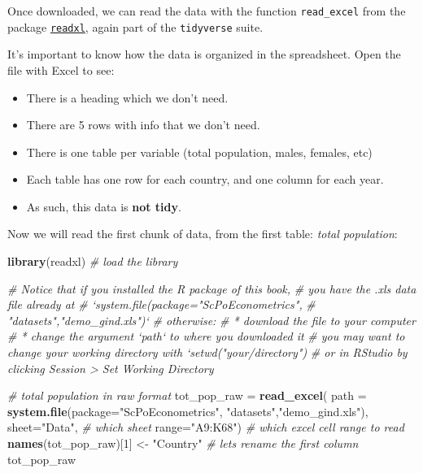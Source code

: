 \documentclass[]{book}
\newenvironment{Shaded}{\begin{snugshade}}{\end{snugshade}}
\newcommand{\KeywordTok}[1]{\textcolor[rgb]{0.13,0.29,0.53}{\textbf{#1}}}
\newcommand{\DataTypeTok}[1]{\textcolor[rgb]{0.13,0.29,0.53}{#1}}
\newcommand{\DecValTok}[1]{\textcolor[rgb]{0.00,0.00,0.81}{#1}}
\newcommand{\StringTok}[1]{\textcolor[rgb]{0.31,0.60,0.02}{#1}}
\newcommand{\CommentTok}[1]{\textcolor[rgb]{0.56,0.35,0.01}{\textit{#1}}}
\newcommand{\NormalTok}[1]{#1}
\providecommand{\tightlist}{%
  \setlength{\itemsep}{0pt}\setlength{\parskip}{0pt}}
\theoremstyle{definition}
\theoremstyle{definition}
\theoremstyle{definition}
\theoremstyle{remark}
\begin{document}
Once downloaded, we can read the data with the function
\texttt{read\_excel} from the package
\href{http://readxl.tidyverse.org}{\texttt{readxl}}, again part of the
\texttt{tidyverse} suite.

It's important to know how the data is organized in the spreadsheet.
Open the file with Excel to see:

\begin{itemize}
\tightlist
\item
  There is a heading which we don't need.
\item
  There are 5 rows with info that we don't need.
\item
  There is one table per variable (total population, males, females,
  etc)
\item
  Each table has one row for each country, and one column for each year.
\item
  As such, this data is \textbf{not tidy}.
\end{itemize}

Now we will read the first chunk of data, from the first table:
\emph{total population}:

\begin{Shaded}
\begin{Highlighting}[]
\KeywordTok{library}\NormalTok{(readxl)  }\CommentTok{# load the library}


\CommentTok{# Notice that if you installed the R package of this book,}
\CommentTok{# you have the .xls data file already at }
\CommentTok{# `system.file(package="ScPoEconometrics",}
\CommentTok{#                        "datasets","demo_gind.xls")`}
\CommentTok{# otherwise:}
\CommentTok{# * download the file to your computer}
\CommentTok{# * change the argument `path` to where you downloaded it}
\CommentTok{# you may want to change your working directory with `setwd("your/directory")}
\CommentTok{# or in RStudio by clicking Session > Set Working Directory}

\CommentTok{# total population in raw format}
\NormalTok{tot_pop_raw =}\StringTok{ }\KeywordTok{read_excel}\NormalTok{(}
                \DataTypeTok{path =} \KeywordTok{system.file}\NormalTok{(}\DataTypeTok{package=}\StringTok{"ScPoEconometrics"}\NormalTok{,}
                                    \StringTok{"datasets"}\NormalTok{,}\StringTok{"demo_gind.xls"}\NormalTok{), }
                \DataTypeTok{sheet=}\StringTok{"Data"}\NormalTok{, }\CommentTok{# which sheet}
                \DataTypeTok{range=}\StringTok{"A9:K68"}\NormalTok{)  }\CommentTok{# which excel cell range to read}
\KeywordTok{names}\NormalTok{(tot_pop_raw)[}\DecValTok{1}\NormalTok{] <-}\StringTok{ "Country"}   \CommentTok{# lets rename the first column}
\NormalTok{tot_pop_raw}
\end{Highlighting}
\end{Shaded}
\end{document}
